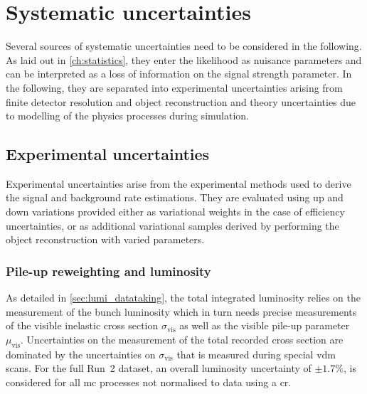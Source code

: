 

\chapter{Systematic uncertainties}

\ifpdf
    \graphicspath{{chapter-uncertainties/Figs/Raster/}{chapter-uncertainties/Figs/PDF/}{chapter-uncertainties/Figs/}}
\else
    \graphicspath{{chapter-uncertainties/Figs/Vector/}{chapter-uncertainties/Figs/}}
\fi

Several sources of systematic uncertainties need to be considered in the following. As laid out in \cref{ch:statistics}, they enter the likelihood as nuisance parameters and can be interpreted as a loss of information on the signal strength parameter. In the following, they are separated into experimental uncertainties arising from finite detector resolution and object reconstruction and theory uncertainties due to modelling of the physics processes during simulation. 

\section{Experimental uncertainties}

Experimental uncertainties arise from the experimental methods used to derive the signal and background rate estimations. They are evaluated using up and down variations provided either as variational weights in the case of efficiency uncertainties, or as additional variational samples derived by performing the object reconstruction with varied parameters.

\subsection{Pile-up reweighting and luminosity}



As detailed in \cref{sec:lumi_datataking}, the total integrated luminosity relies on the measurement of the bunch luminosity which in turn needs precise measurements of the visible inelastic cross section $\sigma_\mathrm{vis}$ as well as the visible pile-up parameter $\mu_\mathrm{vis}$. Uncertainties on the measurement of the total recorded cross section are dominated by the uncertainties on $\sigma_\mathrm{vis}$ that is measured during special \gls{vdm} scans. For the full Run~2 dataset, an overall luminosity uncertainty of $\pm 1.7\%$, is considered for all \gls{mc} processes not normalised to data using a \gls{cr}.

